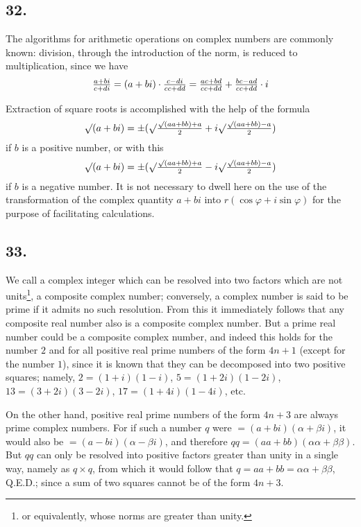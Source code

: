 \documentclass[twoside,12pt]{memoir}
\let\oldfrac\frac
\def\frac#1#2{\mathchoice{\tfrac{#1}{#2}}{\oldfrac{#1}{#2}}{\genfrac{}{}{}{2}{#1}{#2\mathstrut}}{\genfrac{}{}{}{3}{#1}{#2\mathstrut}}}
\begin{document}
\subsection*{32.}
 
The algorithms for arithmetic operations on complex numbers are commonly known: division, through the introduction of the norm, is reduced to multiplication, since we have
\[\frac{a+b i}{c+d i}=(a+b i) \cdot \frac{c-d i}{c c+d d}=\frac{a c+b d}{c c+d d}+\frac{b c-a d}{c c+d d} \cdot i\]
 
Extraction of square roots is accomplished with the help of the formula
\[\surd(a+b i)= \pm(\surd \frac{\surd(a a+b b)+a}{2}+i \surd \frac{\surd(a a+b b)-a}{2})\]
if \(b\) is a positive number, or with this
\[\surd(a+b i)= \pm(\surd \frac{\surd(a a+b b)+a}{2}-i \surd \frac{\surd(a a+b b)-a}{2})\]
if \(b\) is a negative number. It is not necessary to dwell here on the use of the transformation of the complex quantity \(a+b i\) into \(r(\cos \varphi+i \sin \varphi)\) for the purpose of facilitating calculations.
%

\subsection*{33.}

We call a complex integer which can be resolved into two factors which are not units\footnote{or equivalently, whose norms are greater than unity.}, a composite complex number; conversely, a complex number is said to be prime if it admits no such resolution. From this it immediately follows that any composite real number also is a composite complex number. But a prime real number could be a composite complex number, and indeed this holds for the number \(2\) and for all positive real prime numbers of the form \(4n+1\) (except for the number \(1\)), since it is known that they can be decomposed into two positive squares; namely, \(2=(1+i)(1-i)\), \(5=(1+2i)(1-2i)\), \(13=(3+2i)(3-2i)\), \(17=(1+4i)(1-4i)\), etc{.}

On the other hand, positive real prime numbers of the form \(4n+3\) are always prime complex numbers. For if such a number \(q\) were \(=(a+bi)(\alpha+\beta i)\), it would also be \(=(a-bi)(\alpha-\beta i)\), and therefore \(qq=(a a+b b)(\alpha \alpha+\beta \beta)\). But \(qq\) can only be resolved into positive factors greater than unity in a single way, namely as \(q\times q\), from which it would follow that \(q=a a+b b=\alpha \alpha+\beta \beta\), Q.E.D.; since a sum of two squares cannot be of the form \(4n+3\).
%
\end{document}
